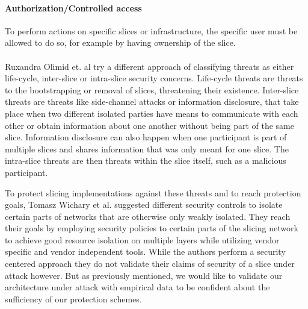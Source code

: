 \paragraph{Authorization/Controlled access} To perform actions on specific slices or infrastructure, the specific user must be allowed to do so, for example by having ownership of the slice.

\paragraph{}Ruxandra Olimid et. al \cite{SE2} try a different approach of classifying threats as either life-cycle, inter-slice or intra-slice security concerns. Life-cycle threats are threats to the bootstrapping or removal of slices, threatening their existence. Inter-slice threats are threats like side-channel attacks or information disclosure, that take place when two different isolated parties have means to communicate with each other or obtain information about one another without being part of the same slice. Information disclosure can also happen when one participant is part of multiple slices and shares information that was only meant for one slice. The intra-slice threats are then threats within the slice itself, such as a malicious participant.

To protect slicing implementations against these threats and to reach protection goals, Tomasz Wichary et al. \cite{SE3} suggested different security controls to isolate certain parts of networks that are otherwise only weakly isolated. They reach their goals by employing security policies to certain parts of the slicing network to achieve good resource isolation on multiple layers while utilizing vendor specific and vendor independent tools. While the authors perform a security centered approach they do not validate their claims of security of a slice under attack however. But as previously mentioned, we would like to validate our architecture  under attack with empirical data to be confident about the sufficiency of our protection schemes.

